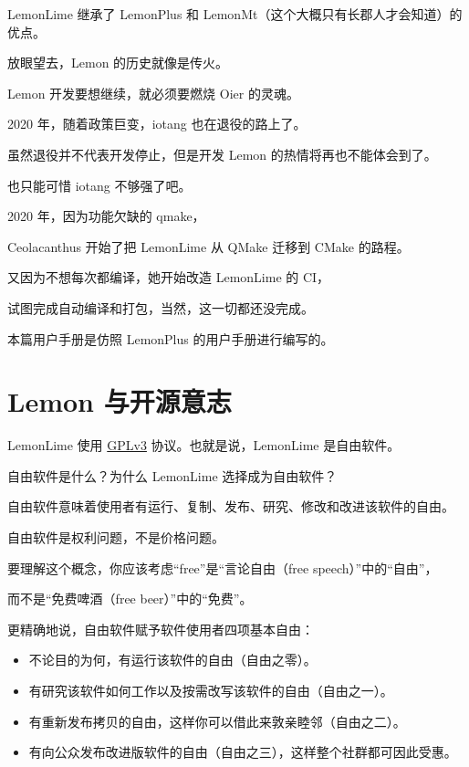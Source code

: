 \documentclass[UTF-8]{ctexart}
\begin{document}
    LemonLime 继承了 LemonPlus 和 LemonMt（这个大概只有长郡人才会知道）的优点。\newline

    放眼望去，Lemon 的历史就像是传火。

    Lemon 开发要想继续，就必须要燃烧 Oier 的灵魂。

    2020 年，随着政策巨变，iotang 也在退役的路上了。

    虽然退役并不代表开发停止，但是开发 Lemon 的热情将再也不能体会到了。

    也只能可惜 iotang 不够强了吧。\newline

    2020 年，因为功能欠缺的 qmake，

    Ceolacanthus 开始了把 LemonLime 从 QMake 迁移到 CMake 的路程。

    又因为不想每次都编译，她开始改造 LemonLime 的 CI，

    试图完成自动编译和打包，当然，这一切都还没完成。\newline

    本篇用户手册是仿照 LemonPlus 的用户手册进行编写的。

    \newpage

    \section{Lemon 与开源意志}

    LemonLime 使用 \href{https://www.gnu.org/licenses/gpl-3.0.html}{GPLv3} 协议。也就是说，LemonLime 是自由软件。\newline

    自由软件是什么？为什么 LemonLime 选择成为自由软件？

    自由软件意味着使用者有运行、复制、发布、研究、修改和改进该软件的自由。

    自由软件是权利问题，不是价格问题。

    要理解这个概念，你应该考虑“free”是“言论自由（free speech）”中的“自由”，

    而不是“免费啤酒（free beer）”中的“免费”。\newline

    更精确地说，自由软件赋予软件使用者四项基本自由：

    \begin{itemize}
        \item 不论目的为何，有运行该软件的自由（自由之零）。
        \item 有研究该软件如何工作以及按需改写该软件的自由（自由之一）。
        \item 有重新发布拷贝的自由，这样你可以借此来敦亲睦邻（自由之二）。
        \item 有向公众发布改进版软件的自由（自由之三），这样整个社群都可因此受惠。
    \end{itemize}
\end{document}
